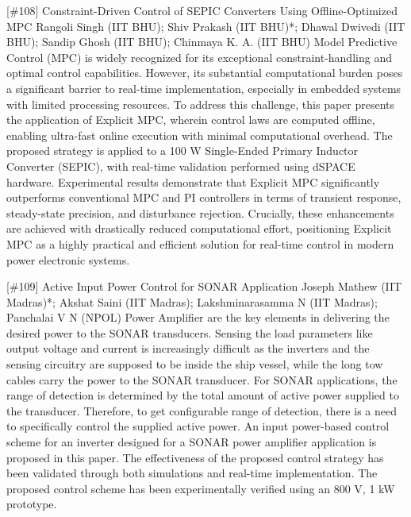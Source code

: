 {} \begin{abstract_online} {[\#108] Constraint-Driven Control of SEPIC Converters Using Offline-Optimized MPC} {} {Rangoli Singh (IIT BHU); Shiv Prakash (IIT BHU)*; Dhawal Dwivedi (IIT BHU); Sandip Ghosh (IIT BHU); Chinmaya K. A. (IIT BHU)} {} Model Predictive Control (MPC) is widely recognized for its exceptional constraint-handling and optimal control capabilities. However, its substantial computational burden poses a significant barrier to real-time implementation, especially in embedded systems with limited processing resources. To address this challenge, this paper presents the application of Explicit MPC, wherein control laws are computed offline, enabling ultra-fast online execution with minimal computational overhead. The proposed strategy is applied to a 100 W Single-Ended Primary Inductor Converter (SEPIC), with real-time validation performed using dSPACE hardware. Experimental results demonstrate that Explicit MPC significantly outperforms conventional MPC and PI controllers in terms of transient response, steady-state precision, and disturbance rejection. Crucially, these enhancements are achieved with drastically reduced computational effort, positioning Explicit MPC as a highly practical and efficient solution for real-time control in modern power electronic systems. \end{abstract_online} 
{} \begin{abstract_online} {[\#109] Active Input Power Control for SONAR Application} {} {Joseph Mathew (IIT Madras)*; Akshat Saini (IIT Madras); Lakshminarasamma N (IIT Madras); Panchalai V N (NPOL)} {} Power Amplifier are the key elements  in delivering the desired power to the SONAR transducers. Sensing the load parameters like  output voltage and current  is increasingly difficult as the inverters and the sensing circuitry are supposed to be inside the ship vessel, while the long tow cables carry the power to the SONAR transducer. For SONAR applications, the range of detection is determined by the total amount of active power supplied to the transducer. Therefore, to get configurable range of detection, there is a need to specifically control the supplied active power. An input power-based control scheme for an inverter designed for a SONAR power amplifier application is proposed in this paper. The effectiveness of the proposed control strategy has been validated through both simulations and real-time implementation. The proposed control scheme has been experimentally verified using an 800 V, 1 kW prototype. \end{abstract_online} 
